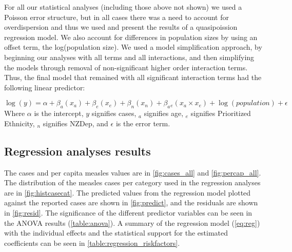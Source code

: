 \documentclass{article}
\begin{document}
For all our statistical analyses (including those above not shown) we used a Poisson error structure, but in all cases there was a need to account for overdispersion and thus we used and present the results of a quasipoission regression model. We also account for differences in population sizes by using an offset term, the log(population size). We used a model simplification approach, by beginning our analyses with all terms and all interactions, and then simplifying the models through removal of non-significant higher order interaction terms. Thus, the final model that remained with all significant interaction terms had the following linear predictor:

\begin{equation} \label{eq:reg}
 \log(y) = \alpha + \beta _a (x_a)+ \beta _e(x_e)+ \beta _n (x_n) + \beta _a{}_e(x_a \times x_e)+ \log(population)  + \epsilon
  \end{equation}
Where $\alpha$ is the intercept, $y$ signifies cases, $_a$ signifies age, $_e$ signifies Prioritized Ethnicity, $_n$ signifies NZDep, and $\epsilon$ is the error term.

\subsection{Regression analyses results}
\label{sub:regression_results}

The cases and per capita measles values are in \autoref{fig:cases_all} and \autoref{fig:percap_all}. The distribution of the measles cases per category used in the regression analyses are in \autoref{fig:histcasecat}. The predicted values from the regression model plotted against the reported cases are shown in \autoref{fig:predict}, and the residuals are shown in \autoref{fig:resid}. The significance of the different predictor variables can be seen in the ANOVA results (\autoref{table:anova}). A summary of the regression model (\autoref{eq:reg}) with the individual effects and the statistical support for the estimated coefficients can be seen in \autoref{table:regression_riskfactors}.
\end{document}
